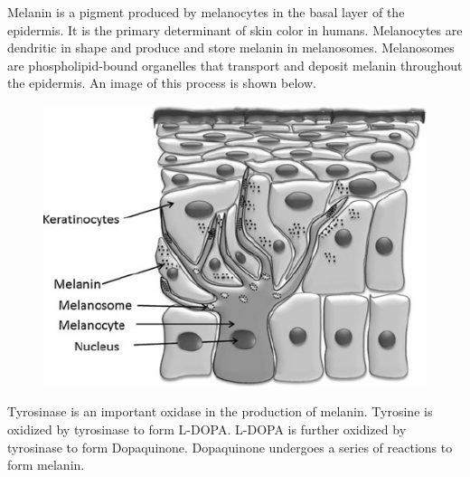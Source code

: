 \documentclass{article}
\begin{document}




Melanin is a pigment produced by melanocytes in the basal layer of the epidermis. It is the primary determinant of skin color in humans. Melanocytes are dendritic in shape and produce and store melanin in melanosomes. Melanosomes are phospholipid-bound organelles that transport and deposit melanin throughout the epidermis. An image of this process is shown below.

\begin{figure}[h]
\includegraphics[scale=0.4]{melanocyte.png}
\centering
\end{figure}

Tyrosinase is an important oxidase in the production of melanin. Tyrosine is oxidized by tyrosinase to form L-DOPA. L-DOPA is further oxidized by tyrosinase to form Dopaquinone. Dopaquinone undergoes a series of reactions to form melanin.
\end{document}
